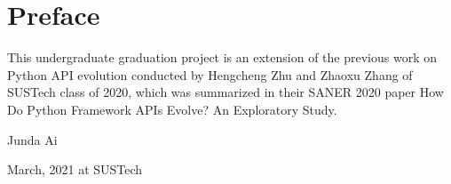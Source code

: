 \chapter{Preface}
\label{chap:preface}
\vskip 28pt

This undergraduate graduation project is an extension of the previous work on Python API evolution conducted by Hengcheng Zhu and Zhaoxu Zhang of SUSTech class of 2020, which was summarized in their SANER 2020 paper How Do Python Framework APIs Evolve? An Exploratory Study.

\begin{flushright}

Junda Ai

March, 2021 at SUSTech

\end{flushright}
